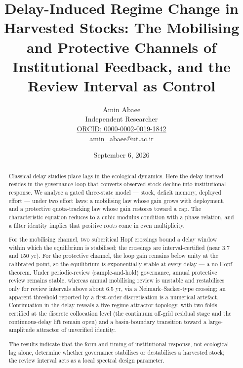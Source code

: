 \documentclass[11pt]{article}
\begin{document}
\title{Delay-Induced Regime Change in Harvested Stocks: The Mobilising and Protective Channels of Institutional Feedback, and the Review Interval as Control}
\author{Amin Abaee\\[0.35em]
{\small Independent Researcher}\\[0.55em]
{\small\href{https://orcid.org/0000-0002-0019-1842}{ORCID: 0000-0002-0019-1842}}\\[0.3em]
{\small\href{mailto:amin\_abaee@ut.ac.ir}{amin\_abaee@ut.ac.ir}}}
\date{September 6, 2026}
\maketitle

\begin{abstract}


Classical delay studies place lags in the ecological dynamics. Here the
delay instead resides in the governance loop that converts observed
stock decline into institutional response. We analyse a gated
three-state model --- stock, deficit memory, deployed effort --- under
two effort laws: a mobilising law whose gain grows with deployment, and
a protective quota-tracking law whose gain restores toward a cap. The
characteristic equation reduces to a cubic modulus condition with a
phase relation, and a filter identity implies that positive roots come
in even multiplicity.

For the mobilising channel, two subcritical Hopf crossings bound a delay
window within which the equilibrium is stabilised; the crossings are
interval-certified (near 3.7 and 150 yr). For the protective channel,
the loop gain remains below unity at the calibrated point, so the
equilibrium is exponentially stable at every delay --- a no-Hopf
theorem. Under periodic-review (sample-and-hold) governance, annual
protective review remains stable, whereas annual mobilising review is
unstable and restabilises only for review intervals above about 6.5 yr,
via a Neimark--Sacker-type crossing; an apparent threshold reported by a
first-order discretisation is a numerical artefact. Continuation in the
delay reveals a five-regime attractor topology, with two folds certified
at the discrete collocation level (the continuum off-grid residual stage
and the continuous-delay lift remain open) and a basin-boundary
transition toward a large-amplitude attractor of unverified identity.

The results indicate that the form and timing of institutional response,
not ecological lag alone, determine whether governance stabilises or
destabilises a harvested stock; the review interval acts as a local
spectral design parameter.

\end{abstract}
\end{document}

